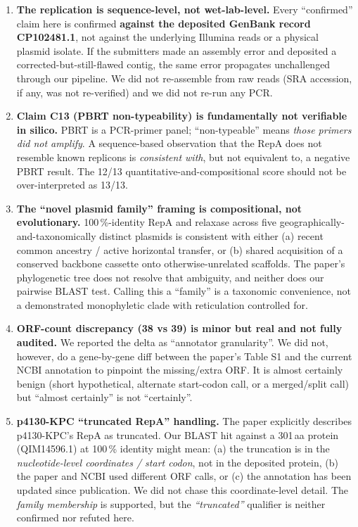 \documentclass[11pt]{article}
\begin{document}
\begin{enumerate}[leftmargin=1.4em, label=\arabic*.]
  \item \textbf{The replication is sequence-level, not wet-lab-level.} Every ``confirmed''
        claim here is confirmed \textbf{against the deposited GenBank record CP102481.1},
        not against the underlying Illumina reads or a physical plasmid isolate. If the
        submitters made an assembly error and deposited a corrected-but-still-flawed
        contig, the same error propagates unchallenged through our pipeline. We did not
        re-assemble from raw reads (SRA accession, if any, was not re-verified) and we did
        not re-run any PCR.

  \item \textbf{Claim C13 (PBRT non-typeability) is fundamentally not verifiable in silico.}
        PBRT is a PCR-primer panel; ``non-typeable'' means \emph{those primers did not
        amplify}. A sequence-based observation that the RepA does not resemble known
        replicons is \emph{consistent with}, but not equivalent to, a negative PBRT result.
        The 12/13 quantitative-and-compositional score should not be over-interpreted as
        13/13.

  \item \textbf{The ``novel plasmid family'' framing is compositional, not evolutionary.}
        100\,\%-identity RepA and relaxase across five geographically-and-taxonomically
        distinct plasmids is consistent with either (a) recent common ancestry / active
        horizontal transfer, or (b) shared acquisition of a conserved backbone cassette
        onto otherwise-unrelated scaffolds. The paper's phylogenetic tree does not resolve
        that ambiguity, and neither does our pairwise BLAST test. Calling this a ``family''
        is a taxonomic convenience, not a demonstrated monophyletic clade with reticulation
        controlled for.

  \item \textbf{ORF-count discrepancy (38 vs 39) is minor but real and not fully audited.}
        We reported the delta as ``annotator granularity''. We did not, however, do a
        gene-by-gene diff between the paper's Table S1 and the current NCBI annotation to
        pinpoint the missing/extra ORF. It is almost certainly benign (short hypothetical,
        alternate start-codon call, or a merged/split call) but ``almost certainly'' is
        not ``certainly''.

  \item \textbf{p4130-KPC ``truncated RepA'' handling.} The paper explicitly describes
        p4130-KPC's RepA as truncated. Our BLAST hit against a 301\,aa protein
        (QIM14596.1) at 100\,\% identity might mean: (a) the truncation is in the
        \emph{nucleotide-level coordinates / start codon}, not in the deposited protein,
        (b) the paper and NCBI used different ORF calls, or (c) the annotation has been
        updated since publication. We did not chase this coordinate-level detail. The
        \emph{family membership} is supported, but the \emph{``truncated''} qualifier is
        neither confirmed nor refuted here.


\end{enumerate}
\end{document}
